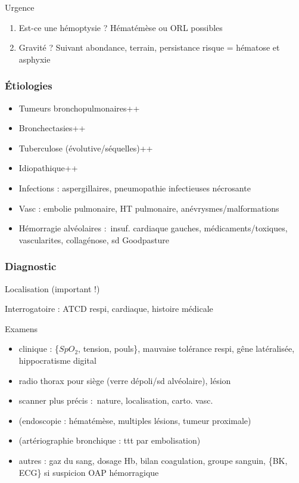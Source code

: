 \documentclass[11pt]{article}
\begin{document}
Urgence 

\begin{enumerate}
\item Est-ce une hémoptysie ? Hématémèse ou ORL possibles
\item Gravité ? Suivant abondance, terrain, persistance \thus risque = hématose et asphyxie
\end{enumerate}

\subsubsection{Étiologies}
\label{sec:org9424d89}

\begin{itemize}
\item Tumeurs bronchopulmonaires++
\item Bronchectasies++
\item Tuberculose (évolutive/séquelles)++
\item Idiopathique++
\item Infections : aspergillaires, pneumopathie infectieuses nécrosante
\item Vasc : embolie pulmonaire, HT pulmonaire, anévrysmes/malformations
\item Hémorragie alvéolaires : insuf. cardiaque gauches, médicaments/toxiques,
vascularites, collagénose, sd Goodpasture
\end{itemize}


\subsubsection{Diagnostic}
\label{sec:org8c3fa23}
Localisation (important !)

Interrogatoire : ATCD respi, cardiaque, histoire médicale

Examens 

\begin{itemize}
\item clinique : \{\(SpO_2\), tension, pouls\}, mauvaise tolérance respi, gêne
latéralisée, hippocratisme digital
\item radio thorax pour siège (verre dépoli/sd alvéolaire), lésion
\item scanner plus précis : nature, localisation, carto. vasc.
\item (endoscopie : hématémèse, multiples lésions, tumeur proximale)
\item (artériographie bronchique : ttt par embolisation)
\item autres : gaz du sang, dosage Hb, bilan coagulation, groupe sanguin, \{BK,
ECG\} si suspicion OAP hémorragique
\end{itemize}
\end{document}
